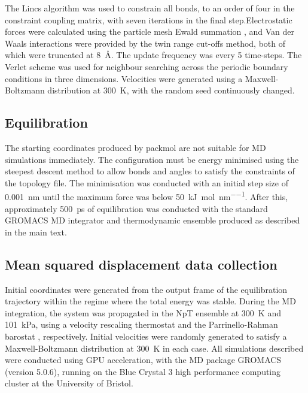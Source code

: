 The Lincs algorithm \cite{hess1997lincs} was used to constrain all bonds, to an order of four in the constraint coupling matrix, with seven iterations in the final step.Electrostatic forces were calculated using the particle mesh Ewald summation \cite{essmannSmoothParticleMesh1995}, and Van der Waals interactions were provided by the twin range cut-offs method, both of which were truncated at \SI{8}{\angstrom}. The update frequency was every \num{5} time-steps. The Verlet scheme \cite{pallFlexibleAlgorithmCalculating2013} was used for neighbour searching across the periodic boundary conditions in three dimensions. Velocities were generated using a Maxwell-Boltzmann distribution at \SI{300}{\kelvin}, with the random seed continuously changed.

\subsection{Equilibration}
 The starting coordinates produced by packmol \cite{martinez2009packmol} are not suitable for MD simulations immediately. The configuration must be energy minimised using the steepest descent method to allow bonds and angles to satisfy the constraints of the topology file. The minimisation was conducted with an initial step size of \SI{0.001}{\nano\meter} until the maximum force was below \SI{50}{\kilo\joule\per\mole\per\nano\meter}. After this, approximately \SI{500}{\pico\second} of equilibration was conducted with the standard GROMACS MD integrator and thermodynamic ensemble produced as described in the main text. 

\subsection{Mean squared displacement data collection}
Initial coordinates were generated from the output frame of the equilibration trajectory within the regime where the total energy was stable. During the MD integration, the system was propagated in the NpT ensemble at \SI{300}{\kelvin} and \SI{101}{\kilo\pascal}, using a velocity rescaling thermostat \cite{bussiCanonicalSamplingVelocity2007} and the Parrinello-Rahman barostat \cite{parrinelloPolymorphicTransitionsSingle1981}, respectively. Initial velocities were randomly generated to satisfy a Maxwell-Boltzmann distribution at \SI{300}{\kelvin} in each case. All simulations described were conducted using GPU acceleration, with the MD package GROMACS (version 5.0.6)\cite{abrahamGROMACSHighPerformance2015}, running on the Blue Crystal 3 high performance computing cluster at the University of Bristol.

